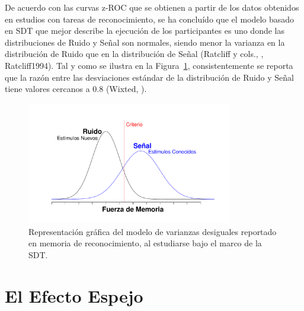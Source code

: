 De acuerdo con las curvas z-ROC que se obtienen a partir de los datos obtenidos en estudios con tareas de reconocimiento, se ha concluído que el modelo basado en SDT que mejor describe la ejecución de los participantes es uno donde las distribuciones de Ruido y Señal son normales, siendo menor la varianza en la distribución de Ruido que en la distribución de Señal (Ratcliff y cols., \citeyear{ Ratcliff1992}, {Ratcliff1994}). Tal y como se ilustra en la Figura~\ref{fig:RM_SDT_2}, consistentemente se reporta que la razón entre las desviaciones estándar de la distribución de Ruido y Señal tiene valores cercanos a 0.8 (Wixted, \citeyear{Wixted2007}).\\

\begin{figure}[h]
\centering
\includegraphics[width=0.80\textwidth]{Figures/RM_SDT_2} 
\caption[SDT en memoria de reconocimiento (varianzas desiguales)]{Representación gráfica del modelo de varianzas desiguales reportado en memoria de reconocimiento, al estudiarse bajo el marco de la SDT.}
\label{fig:RM_SDT_2}
\end{figure}








\section{El Efecto Espejo}

